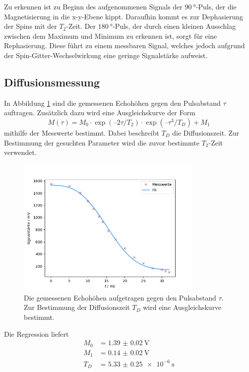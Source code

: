 Zu erkennen ist zu Beginn des aufgenommenen Signals der $\SI{90}{\degree}$-Puls, der die Magnetisierung in die x-y-Ebene kippt.
Daraufhin kommt es zur Dephasierung der Spins mit der $T_2$-Zeit. Der $\SI{180}{\degree}$-Puls, der durch einen kleinen Ausschlag
zwischen dem Maximum und Minimum zu erkennen ist, sorgt für eine Rephasierung. Diese führt zu einem messbaren Signal, welches 
jedoch aufgrund der Spin-Gitter-Wechselwirkung eine geringe Signalstärke aufweist.

\subsection{Diffusionsmessung}
In Abbildung \ref{fig:diff_fit} sind die gemessenen Echohöhen gegen den Pulsabstand $\tau$ auftragen.
Zusätzlich dazu wird eine Ausgleichskurve der Form
\begin{equation}
  M(\tau) = M_0 \cdot \exp(–2\tau/T_2)\cdot \exp(–\tau^3/T_D) + M_1 
\end{equation}
mithilfe der Messwerte bestimmt. Dabei beschreibt $T_D$ die Diffusionszeit. Zur Bestimmung der gesuchten Parameter wird 
die zuvor bestimmte $T_2$-Zeit verwendet.
\begin{figure}[H]
  \centering
  \includegraphics[width=0.8\textwidth]{../Auswertung/Diff_fit.png}
  \caption{Die gemessenen Echohöhen aufgetragen gegen den Pulsabstand $\tau$. Zur Bestimmung der Diffusionszeit $T_D$ wird eine
  Ausgleichskurve bestimmt.}
  \label{fig:diff_fit}
\end{figure} \noindent
Die Regression liefert
\begin{align}
  M_0 &= \SI{1.39(002)}{\volt} \\
  M_1 &= \SI{0.14(002)}{\volt} \\
  T_D &= \SI{5.33(025)e-6}{\second}
\end{align}
